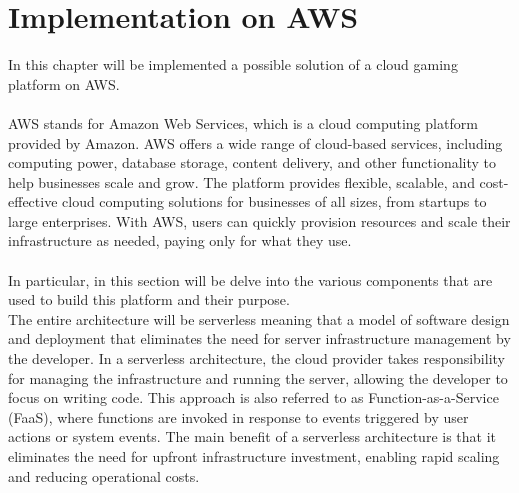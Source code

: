 \documentclass[a4paper,12pt]{report}
\begin{document}
\chapter{Implementation on AWS}
In this chapter will be implemented a possible solution of a cloud gaming platform on AWS.\\\\
AWS stands for Amazon Web Services, which is a cloud computing platform provided by Amazon. AWS offers a wide range of cloud-based services, including computing power, database storage, content delivery, and other functionality to help businesses scale and grow. The platform provides flexible, scalable, and cost-effective cloud computing solutions for businesses of all sizes, from startups to large enterprises. With AWS, users can quickly provision resources and scale their infrastructure as needed, paying only for what they use.\\\\
In particular, in this section will be delve into the various components that are used to build this platform and their purpose.\\
The entire architecture will be serverless meaning that a model of software design and deployment that eliminates the need for server infrastructure management by the developer. In a serverless architecture, the cloud provider takes responsibility for managing the infrastructure and running the server, allowing the developer to focus on writing code. This approach is also referred to as Function-as-a-Service (FaaS), where functions are invoked in response to events triggered by user actions or system events. The main benefit of a serverless architecture is that it eliminates the need for upfront infrastructure investment, enabling rapid scaling and reducing operational costs.
%
\end{document}
